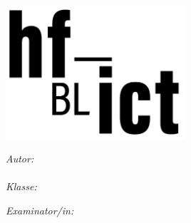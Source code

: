 

\begin{titlepage}

\setlength{\parskip}{0pt}

\begin{center}
\includegraphics[width=0.5\textwidth]{Bilder/hf-ict-Logo}

\vspace{0.5cm}
{\color{black} \univnameger\par}                %
\vspace{0.3cm}

\vspace{1.2cm}                            
{\ttype\par}                                             %
\vspace{0.2cm}
\HRule 
\vspace{0.2cm}
{\bfseries \ttitle\par}                                   %
\vspace{0.2cm}  
\HRule
\vspace{0.8cm}

\begin{minipage}[t]{0.47\textwidth}
\begin{flushleft} 
    \emph{Autor:}\\
    \authorname\\
    \vspace{0.5cm}
    \emph{Klasse:}\\
    \authcls
\end{flushleft}
\end{minipage}
\begin{minipage}[t]{0.47\textwidth}
\begin{flushright} 
    \emph{Examinator/in:} \\
    \supnameA \\
    \vspace{0.5cm}
\end{flushright}
\end{minipage}


\end{center}
\end{titlepage}
